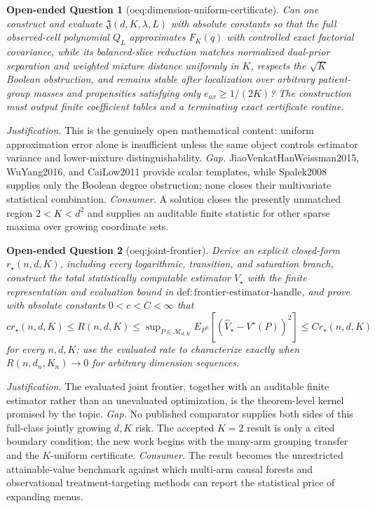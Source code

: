 \documentclass{article}
\newtheorem{openendedquestion}{Open-ended Question}
\begin{document}
\begin{openendedquestion}[oeq:dimension-uniform-certificate]\label{oeq:dimension-uniform-certificate}
Can one construct and evaluate \(\mathfrak J(d,K,\lambda,L)\) with absolute constants so that the full observed-cell polynomial \(Q_L\) approximates \(F_K(q)\) with controlled exact factorial covariance, while its balanced-slice reduction matches normalized dual-prior separation and weighted mixture distance uniformly in \(K\), respects the \(\sqrt K\) Boolean obstruction, and remains stable after localization over arbitrary patient-group masses and propensities satisfying only \(e_{ax}\ge1/(2K)\)? The construction must output finite coefficient tables and a terminating exact certificate routine.
\end{openendedquestion}
\par\smallskip\noindent \textit{Justification.} This is the genuinely open mathematical content: uniform approximation error alone is insufficient unless the same object controls estimator variance and lower-mixture distinguishability. \textit{Gap.} JiaoVenkatHanWeissman2015, WuYang2016, and CaiLow2011 provide scalar templates, while Spalek2008 supplies only the Boolean degree obstruction; none closes their multivariate statistical combination. \textit{Consumer.} A solution closes the presently unmatched region \(2<K<d^2\) and supplies an auditable finite statistic for other sparse maxima over growing coordinate sets.

\begin{openendedquestion}[oeq:joint-frontier]\label{oeq:joint-frontier}
Derive an explicit closed-form \(r_\star(n,d,K)\), including every logarithmic, transition, and saturation branch, construct the total statistically computable estimator \(\widehat V_\star\) with the finite representation and evaluation bound in \(\mathrm{def{:}frontier\text{-}estimator\text{-}handle}\), and prove with absolute constants \(0<c<C<\infty\) that \(c r_\star(n,d,K)\le R(n,d,K)\le\sup_{P\in\mathcal M_{d,K}}E_{P^n}[(\widehat V_\star-V^\star(P))^2]\le C r_\star(n,d,K)\) for every \(n,d,K\); use the evaluated rate to characterize exactly when \(R(n,d_n,K_n)\to0\) for arbitrary dimension sequences.
\end{openendedquestion}
\par\smallskip\noindent \textit{Justification.} The evaluated joint frontier, together with an auditable finite estimator rather than an unevaluated optimization, is the theorem-level kernel promised by the topic. \textit{Gap.} No published comparator supplies both sides of this full-class jointly growing \(d,K\) risk. The accepted \(K=2\) result is only a cited boundary condition; the new work begins with the many-arm grouping transfer and the \(K\)-uniform certificate. \textit{Consumer.} The result becomes the unrestricted attainable-value benchmark against which multi-arm causal forests and observational treatment-targeting methods can report the statistical price of expanding menus.
\end{document}
